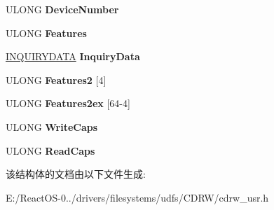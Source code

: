 \begin{DoxyCompactItemize}
U\+L\+O\+NG {\bfseries Device\+Number}
\item 
\mbox{\label{struct___g_e_t___d_e_v_i_c_e___i_n_f_o___u_s_e_r___o_u_t_aa272cf8bc2819628ec09686b23592c23}} 
U\+L\+O\+NG {\bfseries Features}
\item 
\mbox{\label{struct___g_e_t___d_e_v_i_c_e___i_n_f_o___u_s_e_r___o_u_t_aa1f061462d6ec8c838e2cef3b8942412}} 
\hyperlink{struct___i_n_q_u_i_r_y_d_a_t_a}{I\+N\+Q\+U\+I\+R\+Y\+D\+A\+TA} {\bfseries Inquiry\+Data}
\item 
\mbox{\label{struct___g_e_t___d_e_v_i_c_e___i_n_f_o___u_s_e_r___o_u_t_a2f59ac93b0e53dacfc5bf4416034c014}} 
U\+L\+O\+NG {\bfseries Features2} \mbox{[}4\mbox{]}
\item 
\mbox{\label{struct___g_e_t___d_e_v_i_c_e___i_n_f_o___u_s_e_r___o_u_t_a2b06cebb05cb5a675ecaae86dad83275}} 
U\+L\+O\+NG {\bfseries Features2ex} \mbox{[}64-\/4\mbox{]}
\item 
\mbox{\label{struct___g_e_t___d_e_v_i_c_e___i_n_f_o___u_s_e_r___o_u_t_a7f996b052fd4f69283f86ec654b4737a}} 
U\+L\+O\+NG {\bfseries Write\+Caps}
\item 
\mbox{\label{struct___g_e_t___d_e_v_i_c_e___i_n_f_o___u_s_e_r___o_u_t_add8984d342054131fcd5b04390e31861}} 
U\+L\+O\+NG {\bfseries Read\+Caps}
\end{DoxyCompactItemize}


该结构体的文档由以下文件生成\+:\begin{DoxyCompactItemize}
\item 
E\+:/\+React\+O\+S-\/0../drivers/filesystems/udfs/\+C\+D\+R\+W/cdrw\+\_\+usr.\+h\end{DoxyCompactItemize}

